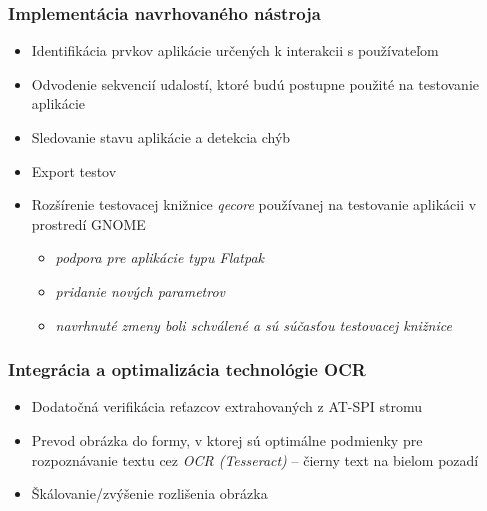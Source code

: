 \documentclass[10pt,xcolor=pdflatex,hyperref={unicode}]{beamer}
\begin{document}
\begin{frame}[fragile]\frametitle{Implementácia navrhovaného nástroja}

\begin{itemize}

\item Identifikácia prvkov aplikácie určených k interakcii s používateľom

\vspace{3mm}
\item Odvodenie sekvencií udalostí, ktoré budú postupne použité na testovanie aplikácie

\vspace{3mm}
\item Sledovanie stavu aplikácie a detekcia chýb

\vspace{3mm}
\item Export testov
\vspace{3mm}
\item Rozšírenie testovacej knižnice \textit{qecore} používanej na testovanie aplikácii v prostredí GNOME
\begin{itemize}
    \item \emph{podpora pre aplikácie typu Flatpak}
    \item \emph{pridanie nových parametrov}
    \item \emph{navrhnuté zmeny boli schválené a sú súčasťou testovacej knižnice}
\end{itemize}
\end{itemize}
\end{frame}



\begin{frame}[fragile]\frametitle{Integrácia a optimalizácia technológie OCR}
\begin{itemize}
\item Dodatočná verifikácia reťazcov extrahovaných z AT-SPI stromu
\item Prevod obrázka do formy, v ktorej sú optimálne podmienky pre rozpoznávanie textu cez \textit{OCR (Tesseract)} -- čierny text na bielom pozadí
\item Škálovanie/zvýšenie rozlišenia obrázka
\end{itemize}
 \begin{figure}[h]
 \end{figure}

\end{frame}
\end{document}
